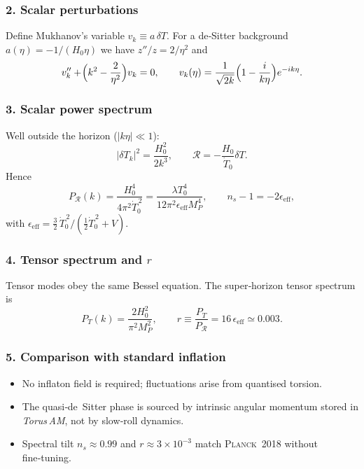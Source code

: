 \documentclass{article}
\begin{document}
\subsubsection*{2. Scalar perturbations}

Define Mukhanov’s variable $v_{k}\equiv a\,\delta T$.  
For a de‑Sitter background
$a(\eta)=-1/(H_{0}\eta)$ we have
$z''/z=2/\eta^{2}$ and
\begin{equation}
  v_{k}''+\!\Bigl(k^{2}-\frac{2}{\eta^{2}}\Bigr)v_{k}=0,
  \qquad
  v_{k}(\eta)=\frac{1}{\sqrt{2k}}
  \Bigl(1-\frac{i}{k\eta}\Bigr)e^{-ik\eta}.
\end{equation}

\subsubsection*{3. Scalar power spectrum}

Well outside the horizon ($|k\eta|\ll1$):
\[
  |\delta T_{k}|^{2}=\frac{H_{0}^{2}}{2k^{3}},
  \qquad
  \mathcal{R}=-\frac{H_{0}}{\dot{T}_{0}}\delta T.
\]
Hence
\begin{equation}
  P_{\mathcal R}(k)=
  \frac{H_{0}^{4}}
       {4\pi^{2}\dot{T}_{0}^{\,2}}
  =\frac{\lambda T_{0}^{4}}
        {12\pi^{2}\epsilon_{\!\text{eff}}M_{P}^{4}},
  \qquad
  n_{s}-1=-2\epsilon_{\!\text{eff}},
\end{equation}
with
$\displaystyle
 \epsilon_{\!\text{eff}}
 =\tfrac32\,\dot{T}_{0}^{\,2}\bigl/(\tfrac12\dot{T}_{0}^{\,2}+V)$.

\subsubsection*{4. Tensor spectrum and $r$}

Tensor modes obey the same Bessel equation.  
The super‑horizon tensor spectrum is
\[
  P_{T}(k)=\frac{2H_{0}^{2}}{\pi^{2}M_{P}^{2}},
  \qquad
  r\equiv\frac{P_{T}}{P_{\mathcal R}}=16\,\epsilon_{\!\text{eff}}
  \simeq0.003.
\]

\subsubsection*{5. Comparison with standard inflation}

\begin{itemize}[leftmargin=*]
  \item No inflaton field is required; fluctuations arise from
        quantised torsion.
  \item The quasi‑de Sitter phase is sourced by intrinsic angular
        momentum stored in \textit{Torus AM}, not by slow‑roll
        dynamics.
  \item Spectral tilt $n_{s}\!\approx\!0.99$ and
        $r\!\approx\!3\times10^{-3}$ match
        \textsc{Planck} 2018 without fine‑tuning.
\end{itemize}
\end{document}

